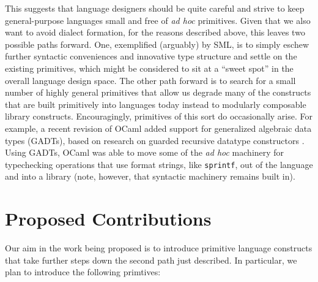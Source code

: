 This suggests that language designers should be quite careful and strive to keep general-purpose languages small and free of \emph{ad hoc} primitives. Given that we also want to avoid dialect formation, for the reasons described above, this leaves  two possible paths forward. One, exemplified (arguably) by SML, is to simply eschew further syntactic conveniences and innovative type structure and settle on the existing primitives, which might be considered to sit at a ``sweet spot'' in the overall language design space. %
The other path forward is to search for a small number of highly general primitives that allow us degrade many of the constructs that are built primitively into languages today instead to modularly composable library constructs. 
Encouragingly, primitives of this sort do occasionally arise. For example, a recent revision of OCaml added support for  generalized algebraic data types (GADTs), based on research on guarded recursive datatype constructors \cite{XiCheChe03}. Using GADTs, OCaml was able to move some of the \emph{ad hoc} machinery for typechecking operations that use format strings, like \texttt{sprintf}, out of the language and into a library (note, however, that syntactic machinery remains  built in). 



\section{Proposed Contributions}
Our aim in the work being proposed is to introduce primitive language constructs that take further steps down the second path just described. In particular, we plan to introduce the following primtives:

